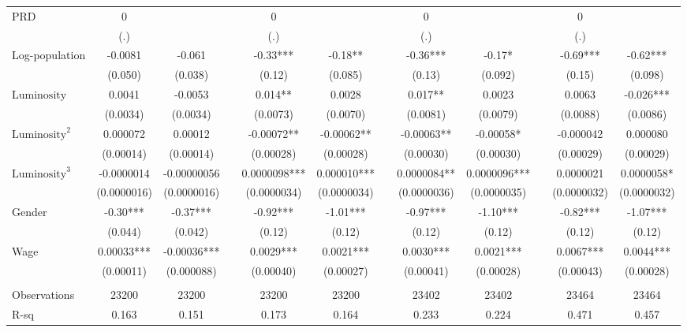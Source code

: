 \begin{tabular}{lccccccccccc}
PRD   & 0     &       &       & 0     &       &       & 0     &       &       & 0     &  \\
      & (.)   &       &       & (.)   &       &       & (.)   &       &       & (.)   &  \\
\midrule
Log-population & -0.0081 & -0.061 &       & -0.33*** & -0.18** &       & -0.36*** & -0.17* &       & -0.69*** & -0.62*** \\
      & (0.050) & (0.038) &       & (0.12) & (0.085) &       & (0.13) & (0.092) &       & (0.15) & (0.098) \\
$\text{Luminosity}$ & 0.0041 & -0.0053 &       & 0.014** & 0.0028 &       & 0.017** & 0.0023 &       & 0.0063 & -0.026*** \\
      & (0.0034) & (0.0034) &       & (0.0073) & (0.0070) &       & (0.0081) & (0.0079) &       & (0.0088) & (0.0086) \\
$\text{Luminosity}^2$ & 0.000072 & 0.00012 &       & -0.00072** & -0.00062** &       & -0.00063** & -0.00058* &       & -0.000042 & 0.000080 \\
      & (0.00014) & (0.00014) &       & (0.00028) & (0.00028) &       & (0.00030) & (0.00030) &       & (0.00029) & (0.00029) \\
$\text{Luminosity}^3$ & -0.0000014 & -0.00000056 &       & 0.0000098*** & 0.000010*** &       & 0.0000084** & 0.0000096*** &       & 0.0000021 & 0.0000058* \\
      & (0.0000016) & (0.0000016) &       & (0.0000034) & (0.0000034) &       & (0.0000036) & (0.0000035) &       & (0.0000032) & (0.0000032) \\
Gender & -0.30*** & -0.37*** &       & -0.92*** & -1.01*** &       & -0.97*** & -1.10*** &       & -0.82*** & -1.07*** \\
      & (0.044) & (0.042) &       & (0.12) & (0.12) &       & (0.12) & (0.12) &       & (0.12) & (0.12) \\
Wage  & 0.00033*** & -0.00036*** &       & 0.0029*** & 0.0021*** &       & 0.0030*** & 0.0021*** &       & 0.0067*** & 0.0044*** \\
      & (0.00011) & (0.000088) &       & (0.00040) & (0.00027) &       & (0.00041) & (0.00028) &       & (0.00043) & (0.00028) \\
      &       &       &       &       &       &       &       &       &       &       &  \\
\midrule
Observations & 23200 & 23200 &       & 23200 & 23200 &       & 23402 & 23402 &       & 23464 & 23464 \\
R-sq  & 0.163 & 0.151 &       & 0.173 & 0.164 &       & 0.233 & 0.224 &       & 0.471 & 0.457 \\

\end{tabular}
